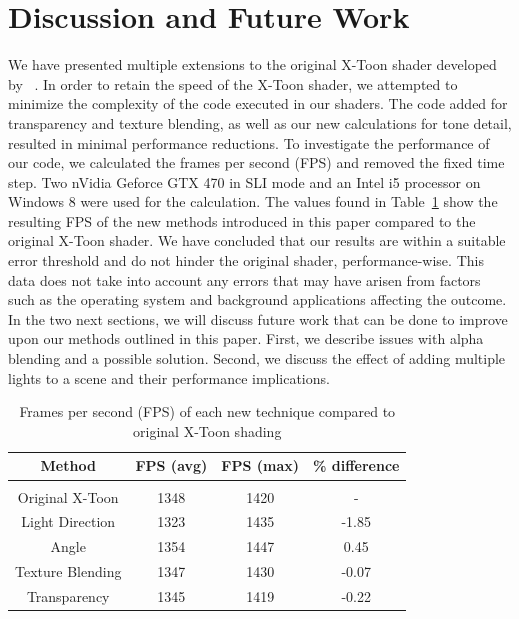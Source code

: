 \documentclass[annual]{acmsiggraph}
\begin{document}
\section{Discussion and Future Work}
\label{sec:discussion}
We have presented multiple extensions to the original X-Toon shader developed by  ~\cite{BTM06a}.  In order to retain the speed of the X-Toon shader, we attempted to minimize the complexity of the code executed in our shaders. The code added for transparency and texture blending, as well as our new calculations for tone detail, resulted in minimal performance reductions. To investigate the performance of our code, we calculated the frames per second (FPS) and removed the fixed time step. Two nVidia Geforce GTX 470 in SLI mode and an Intel i5 processor on Windows 8 were used for the calculation. The values found in Table~\ref{tab:fps} show the resulting FPS of the new methods introduced in this paper compared to the original X-Toon shader. We have concluded that our results are within a suitable error threshold and do not hinder the original shader, performance-wise. This data does not take into account any errors that may have arisen from factors such as the operating system and background applications affecting the outcome. 
In the two next sections, we will discuss future work that can be done to improve upon our methods outlined in this paper. First, we describe issues with alpha blending and a possible solution. Second, we discuss the effect of adding multiple lights to a scene and their performance implications.

\begin{table}
	\centering
	\caption{Frames per second (FPS) of each new technique compared to original X-Toon shading}
	\label{tab:fps}
	\begin{tabular}{cccc}
		\hline
    		Method  & FPS (avg) & FPS (max) & \% difference \\
		\hline\hline \\
    		Original X-Toon  & 1348 & 1420  & -                  \\
    		Light Direction & 1323 & 1435 & -1.85                \\
		Angle & 1354 & 1447 & 0.45 \\
		Texture Blending & 1347 & 1430 & -0.07 \\
		Transparency & 1345 & 1419 & -0.22 \\
		\hline
	\end{tabular}
\end{table}
\end{document}
